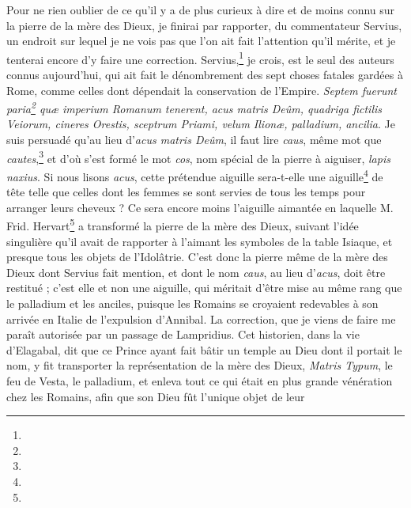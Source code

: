 \documentclass[a4paper, 11pt, oneside, polutonikogreek, french]{article}
\begin{document}
Pour ne rien oublier de ce qu'il y a de plus curieux à dire et de moins connu sur la pierre de la mère des Dieux, je finirai par rapporter, du commentateur Servius, un endroit sur lequel je ne vois pas que l'on ait fait l'attention qu'il mérite, et je tenterai encore d'y faire une correction. Servius,\footnote{} je crois, est le seul des auteurs connus aujourd'hui, qui ait fait le dénombrement des sept choses fatales gardées à Rome, comme celles dont dépendait la conservation de l'Empire. \emph{Septem fuerunt paria\footnote{} quæ imperium Romanum tenerent, acus matris Deûm, quadriga fictilis Veiorum, cineres Orestis, sceptrum Priami, velum Ilionæ, palladium, ancilia}. Je suis persuadé qu'au lieu d'\emph{acus matris Deûm}, il faut lire \emph{caus}, même mot que \emph{cautes},\footnote{} et d'où s'est formé le mot \emph{cos}, nom spécial de la pierre à aiguiser, \emph{lapis naxius}. Si nous lisons \emph{acus}, cette prétendue aiguille sera-t-elle une aiguille\footnote{} de tête telle que celles dont les femmes se sont servies de tous les temps pour arranger leurs cheveux ? Ce sera encore moins l'aiguille aimantée en laquelle M. Frid. Hervart\footnote{} a transformé la pierre de la mère des Dieux, suivant l'idée singulière qu'il avait de rapporter à l'aimant les symboles de la table Isiaque, et presque tous les objets de l'Idolâtrie. C'est donc la pierre même de la mère des Dieux dont Servius fait mention, et dont le nom \emph{caus}, au lieu d'\emph{acus}, doit être restitué ; c'est elle et non une aiguille, qui méritait d'être mise au même rang que le palladium et les anciles, puisque les Romains se croyaient redevables à son arrivée en Italie de l'expulsion d'Annibal. La correction, que je viens de faire me paraît autorisée par un passage de Lampridius. Cet historien, dans la vie d'Elagabal, dit que ce Prince ayant fait bâtir un temple au Dieu dont il portait le nom, y fit transporter la représentation de la mère des Dieux, \emph{Matris Typum}, le feu de Vesta, le palladium, et enleva tout ce qui était en plus grande vénération chez les Romains, afin que son Dieu fût l'unique objet de leur 
\end{document}
